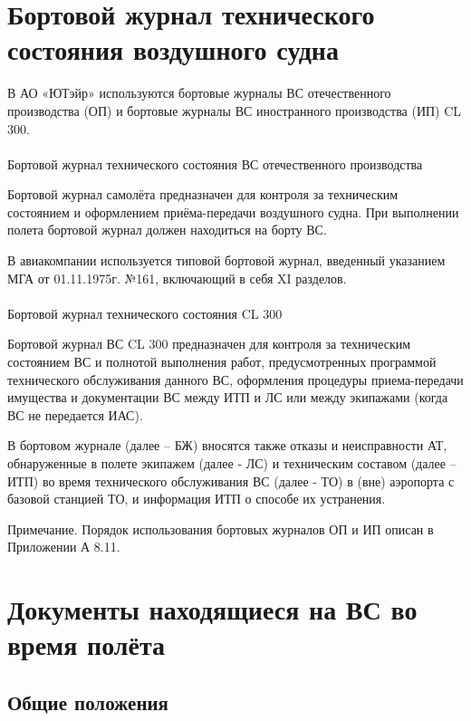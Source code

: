 \section{Бортовой журнал технического состояния воздушного судна}

В АО «ЮТэйр» используются бортовые журналы ВС отечественного производства (ОП) и бортовые журналы ВС иностранного производства (ИП) CL 300.

\paragraph{} Бортовой журнал технического состояния ВС отечественного производства

Бортовой журнал самолёта предназначен для контроля за техническим состоянием и оформлением приёма-передачи воздушного судна. При выполнении полета бортовой журнал должен находиться на борту ВС.

В авиакомпании используется типовой бортовой журнал, введенный указанием МГА от 01.11.1975г. №161, включающий в себя XI разделов.

\paragraph{} Бортовой журнал технического состояния CL 300 

Бортовой журнал ВС CL 300 предназначен для контроля за техническим состоянием ВС и полнотой выполнения работ, предусмотренных программой технического обслуживания данного ВС, оформления процедуры приема-передачи имущества и документации ВС между ИТП и ЛС или между экипажами (когда ВС не передается ИАС).

В бортовом журнале (далее – БЖ) вносятся также отказы и неисправности АТ, обнаруженные в полете экипажем (далее - ЛС) и техническим составом (далее – ИТП) во время технического обслуживания ВС (далее - ТО) в (вне) аэропорта с базовой станцией ТО, и информация ИТП о способе их устранения.

Примечание. Порядок использования бортовых журналов ОП и ИП описан в Приложении А 8.11.


\section{Документы находящиеся на ВС во время полёта}

\subsection{Общие положения}

